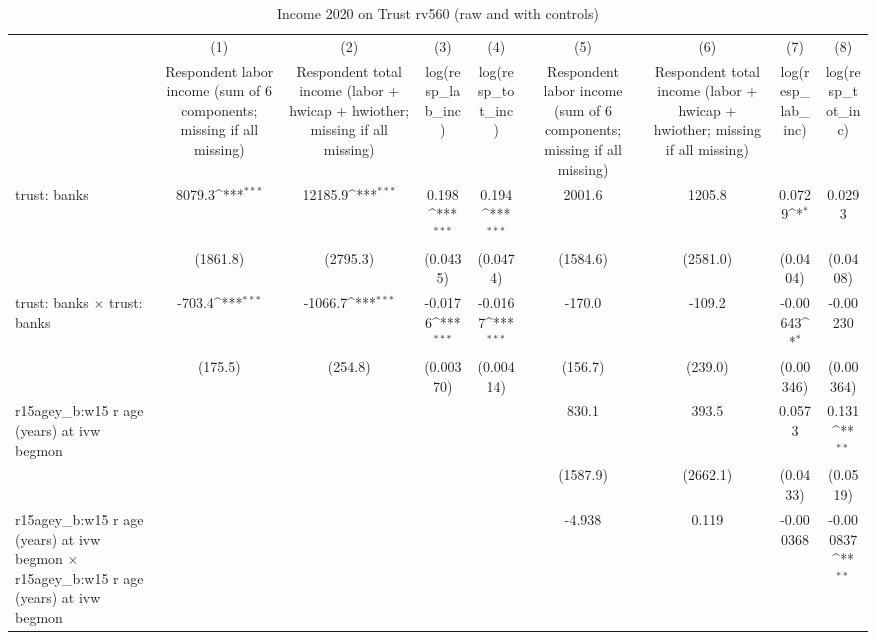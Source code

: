 \begin{table}[htbp]\centering
\def\sym#1{\ifmmode^{#1}\else\(^{#1}\)\fi}
\caption{Income 2020 on Trust rv560 (raw and with controls)}
\begin{tabular}{l*{8}{c}}
\toprule
                &\multicolumn{1}{c}{(1)}&\multicolumn{1}{c}{(2)}&\multicolumn{1}{c}{(3)}&\multicolumn{1}{c}{(4)}&\multicolumn{1}{c}{(5)}&\multicolumn{1}{c}{(6)}&\multicolumn{1}{c}{(7)}&\multicolumn{1}{c}{(8)}\\
                &\multicolumn{1}{c}{Respondent labor income (sum of 6 components; missing if all missing)}&\multicolumn{1}{c}{Respondent total income (labor + hwicap + hwiother; missing if all missing)}&\multicolumn{1}{c}{log(resp\_lab\_inc)}&\multicolumn{1}{c}{log(resp\_tot\_inc)}&\multicolumn{1}{c}{Respondent labor income (sum of 6 components; missing if all missing)}&\multicolumn{1}{c}{Respondent total income (labor + hwicap + hwiother; missing if all missing)}&\multicolumn{1}{c}{log(resp\_lab\_inc)}&\multicolumn{1}{c}{log(resp\_tot\_inc)}\\
\midrule
trust: banks    &   8079.3\sym{***}&  12185.9\sym{***}&    0.198\sym{***}&    0.194\sym{***}&   2001.6         &   1205.8         &   0.0729\sym{*}  &   0.0293         \\
                & (1861.8)         & (2795.3)         & (0.0435)         & (0.0474)         & (1584.6)         & (2581.0)         & (0.0404)         & (0.0408)         \\
\addlinespace
trust: banks $\times$ trust: banks&   -703.4\sym{***}&  -1066.7\sym{***}&  -0.0176\sym{***}&  -0.0167\sym{***}&   -170.0         &   -109.2         & -0.00643\sym{*}  & -0.00230         \\
                &  (175.5)         &  (254.8)         &(0.00370)         &(0.00414)         &  (156.7)         &  (239.0)         &(0.00346)         &(0.00364)         \\
\addlinespace
r15agey\_b:w15 r age (years) at ivw begmon&                  &                  &                  &                  &    830.1         &    393.5         &   0.0573         &    0.131\sym{**} \\
                &                  &                  &                  &                  & (1587.9)         & (2662.1)         & (0.0433)         & (0.0519)         \\
\addlinespace
r15agey\_b:w15 r age (years) at ivw begmon $\times$ r15agey\_b:w15 r age (years) at ivw begmon&                  &                  &                  &                  &   -4.938         &    0.119         &-0.000368         &-0.000837\sym{**} \\

\end{tabular}
\end{table}
